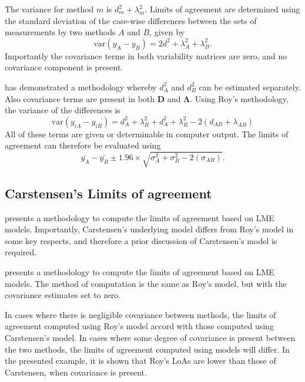\documentclass[12pt, a4paper]{article}
\theoremstyle{plain}
\theoremstyle{definition}
\theoremstyle{remark}
\begin{document}
The variance for method $m$ is $d^2_{m}+\lambda^2_{m}$. Limits of agreement are determined using the standard deviation of the case-wise differences between the sets of measurements by two methods $A$ and $B$, given by
\begin{equation}
\mbox{var} (y_{A}-y_{B}) = 2d^2 + \lambda^2_{A}+ \lambda^2_{B}.
\end{equation}
Importantly the covariance terms in both variability matrices are zero, and no covariance component is present.


\citet{roy} has demonstrated a methodology whereby $d^2_{A}$ and $d^2_{B}$ can be estimated separately. Also covariance terms are present in both $\boldsymbol{D}$ and $\boldsymbol{\Lambda}$. Using Roy's methodology, the variance of the differences is
\begin{equation}
\mbox{var} (y_{iA}-y_{iB})= d^2_{A} + \lambda^2_{B} + d^2_{A} + \lambda^2_{B} - 2(d_{AB} + \lambda_{AB})
\end{equation}
All of these terms are given or determinable in computer output.
The limits of agreement can therefore be evaluated using
\begin{equation}
\bar{y_{A}}-\bar{y_{B}} \pm 1.96 \times \sqrt{ \sigma^2_{A} + \sigma^2_{B}  - 2(\sigma_{AB})}.
\end{equation}


\subsection{Carstensen's Limits of agreement}
\citet{BXC2008} presents a methodology to compute the limits of
agreement based on LME models. Importantly, Carstensen's underlying model differs from Roy's model in some key respects, and therefore a prior discussion of Carstensen's model is required.

\citet{BXC2008} presents a methodology to compute the limits of agreement based on LME models. The method of computation is the same as Roy's model, but with the covariance estimates set to zero.

In cases where there is negligible covariance between methods, the limits of agreement computed using Roy's model accord with those computed using Carstensen's model. In cases where some degree of
covariance is present between the two methods, the limits of agreement computed using models will differ. In the presented example, it is shown that Roy's LoAs are lower than those of Carstensen, when covariance is present.
\end{document}
